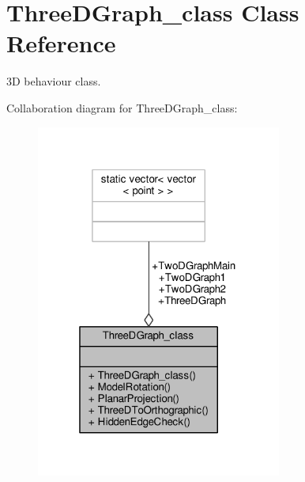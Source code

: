 \hypertarget{classThreeDGraph__class}{}\section{Three\+D\+Graph\+\_\+class Class Reference}
\label{classThreeDGraph__class}


3D behaviour class.  




Collaboration diagram for Three\+D\+Graph\+\_\+class\+:
\nopagebreak
\begin{figure}[H]
\begin{center}
\leavevmode
\includegraphics[width=229pt]{classThreeDGraph__class__coll__graph}
\end{center}
\end{figure}
